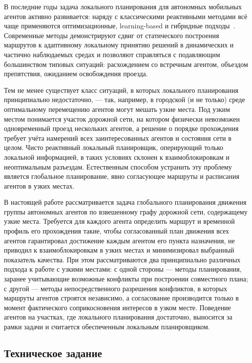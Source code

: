 В последние годы задача локального планирования для автономных мобильных агентов активно развивается: 
наряду с классическими реактивными методами всё чаще применяются оптимизационные, learning-based и 
гибридные подходы~\cite{hybrid-classical-rl-local-planner,mobile-robot-path-planning-survey,wayformer}. 
Современные методы демонстрируют сдвиг от статического построения маршрутов к адаптивному локальному 
принятию решений в динамических и частично наблюдаемых средах и позволяют справляться с подавляющим 
большинством типовых ситуаций: расхождением со встречным агентом, объездом препятствия, ожиданием 
освобождения проезда.

Тем не менее существует класс ситуаций, в которых локального планирования принципиально недостаточно, 
--- так, например, в городской (и не только) среде оптимальному перемещению агентов могут мешать узкие 
места. Под узким местом понимается участок дорожной сети, на котором физически невозможен одновременный 
проезд нескольких агентов, а решение о порядке прохождения требует учёта намерений всех заинтересованных 
агентов и состояния сети в целом. Чисто реактивный локальный планировщик, оперирующий только локальной 
информацией, в таких условиях склонен к взаимоблокировкам и неоптимальным разъездам. Естественным 
способом устранить эту проблему является глобальное планирование, явно согласующее маршруты и 
расписания агентов в узких местах.

В настоящей работе рассматривается задача глобального планирования движения группы автономных 
агентов по взвешенному графу дорожной сети, содержащему узкие места. Требуется для каждого агента 
определить маршрут и временной профиль его прохождения такие, чтобы согласованный план движения всех 
агентов гарантировал достижение каждым агентом его пункта назначения, не приводил к взаимоблокировкам 
в узких местах и минимизировал выбранный показатель качества. При этом рассматриваются два принципиально
различных подхода к работе с узкими местами: с одной стороны --- методы планирования, заранее учитывающие 
возможные конфликты при построении совместного плана; с другой --- методы непосредственного разрешения 
конфликтов, в которых маршруты агентов строятся независимо, а согласование производится только в момент 
фактического соприкосновения интересов в узком месте. Поведение агентов на участках, где локального 
планирования достаточно, выносится за рамки задачи и считается обеспеченным локальным 
планировщиком.

\subsection{Техническое задание}

